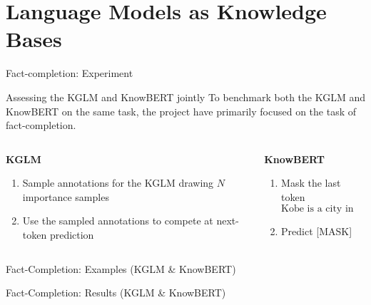 \section{Language Models as Knowledge Bases}

\begin{frame}{Fact-completion: Experiment}
    \begin{block}{Assessing the KGLM and KnowBERT jointly}
        To benchmark both the KGLM and KnowBERT on the same task, the project have primarily focused on the task of fact-completion.
    \end{block}
{\footnotesize
\begin{columns}
\begin{column}[T]{0.5\textwidth}
    \textbf{KGLM}
    \begin{enumerate}
        \item Sample annotations for the KGLM drawing $N$ importance samples
        \item Use the sampled annotations to compete at next-token prediction
    \end{enumerate}
\end{column}
\begin{column}[T]{0.5\textwidth}
    \textbf{KnowBERT}
    \begin{enumerate}
        \item Mask the last token
        \begin{equation*}
            \text{Kobe is a city in [MASK]}
        \end{equation*}
        \item Predict [MASK]
    \end{enumerate}
\end{column}
\end{columns}
}
\end{frame}
 
\begin{frame}{Fact-Completion: Examples (KGLM \& KnowBERT)}

\end{frame}

\begin{frame}{Fact-Completion: Results (KGLM \& KnowBERT)}

\end{frame} 






